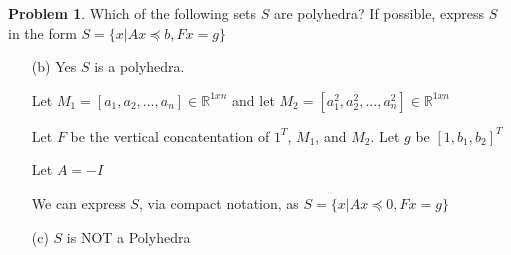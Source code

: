 \documentclass{article}
\theoremstyle{definition}
\newtheorem{problem}{Problem}
\begin{document}
\begin{problem}
    Which of the following sets $S$ are polyhedra? If possible, express $S$ in the form $S = \{x | Ax \preceq b, Fx = g \}$
\begin{enumerate}
    \item[(b)]  Yes $S$ is a polyhedra. 

    Let $M_1 = [a_1, a_2, ..., a_n] \in \mathbb{R}^{1 x n}$ and let $M_2 = [a_1^2, a_2^2, ..., a_n^2] \in \mathbb{R}^{1 x n}$

    Let $F$ be the vertical concatentation of $1^T$, $M_1$, and $M_2$. Let $g$ be $[1, b_1, b_2]^T$

    Let $A = -I$
    
    We can express $S$, via compact notation, as $S = \{x | Ax \preceq 0, Fx = g \}$

    \item [(c)] $S$ is NOT a Polyhedra 
\end{enumerate}
\end{problem}
\end{document}
